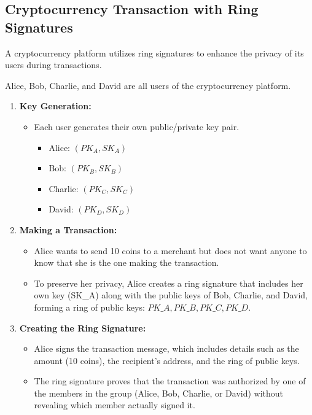 \documentclass[12pt]{article}
\begin{document}
\subsection{Cryptocurrency Transaction with Ring Signatures}

A cryptocurrency platform utilizes ring signatures to enhance the privacy of its users during transactions. 

Alice, Bob, Charlie, and David are all users of the cryptocurrency platform.

\begin{enumerate}
    \item \textbf{Key Generation:}
    \begin{itemize}
        \item Each user generates their own public/private key pair.
        \begin{itemize}
            \item Alice: \( (PK_A, SK_A) \)
            \item Bob: \( (PK_B, SK_B) \)
            \item Charlie: \( (PK_C, SK_C) \)
            \item David: \( (PK_D, SK_D) \)
        \end{itemize}
    \end{itemize}

    \item \textbf{Making a Transaction:}
    \begin{itemize}
        \item Alice wants to send 10 coins to a merchant but does not want anyone to know that she is the one making the transaction.
        \item To preserve her privacy, Alice creates a ring signature that includes her own key (SK\_A) along with the public keys of Bob, Charlie, and David, forming a ring of public keys: \( PK\_A, PK\_B, PK\_C, PK\_D \).
    \end{itemize}

    \item \textbf{Creating the Ring Signature:}
    \begin{itemize}
        \item Alice signs the transaction message, which includes details such as the amount (10 coins), the recipient's address, and the ring of public keys.
        \item The ring signature proves that the transaction was authorized by one of the members in the group (Alice, Bob, Charlie, or David) without revealing which member actually signed it.
    \end{itemize}


\end{enumerate}
\end{document}
